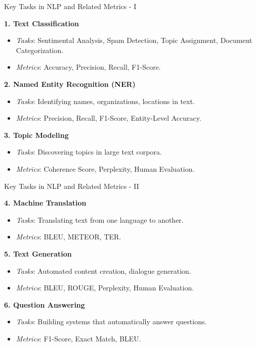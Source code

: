 \documentclass{beamer}
\newenvironment{stepitemize}{\begin{itemize}[<+->]}{\end{itemize} }
\begin{document}
\begin{frame}{Key Tasks in NLP and Related Metrics - I}

\textbf{1. Text Classification}
\begin{stepitemize}
  \item \textit{Tasks}: Sentimental Analysis, Spam Detection, Topic Assignment, Document Categorization.
  \item \textit{Metrics}: Accuracy, Precision, Recall, F1-Score.
\end{stepitemize}

\textbf{2. Named Entity Recognition (NER)}
\begin{stepitemize}
  \item \textit{Tasks}: Identifying names, organizations, locations in text.
  \item \textit{Metrics}: Precision, Recall, F1-Score, Entity-Level Accuracy.
\end{stepitemize}

\textbf{3. Topic Modeling}
\begin{stepitemize}
  \item \textit{Tasks}: Discovering topics in large text corpora.
  \item \textit{Metrics}: Coherence Score, Perplexity, Human Evaluation.
\end{stepitemize}

\end{frame}

\begin{frame}{Key Tasks in NLP and Related Metrics - II}

\textbf{4. Machine Translation}
\begin{stepitemize}
  \item \textit{Tasks}: Translating text from one language to another.
  \item \textit{Metrics}: BLEU, METEOR, TER.
\end{stepitemize}

\textbf{5. Text Generation}
\begin{stepitemize}
  \item \textit{Tasks}: Automated content creation, dialogue generation.
  \item \textit{Metrics}: BLEU, ROUGE, Perplexity, Human Evaluation.
\end{stepitemize}

\textbf{6. Question Answering}
\begin{stepitemize}
  \item \textit{Tasks}: Building systems that automatically answer questions.
  \item \textit{Metrics}: F1-Score, Exact Match, BLEU.
\end{stepitemize}

\end{frame}
\end{document}
